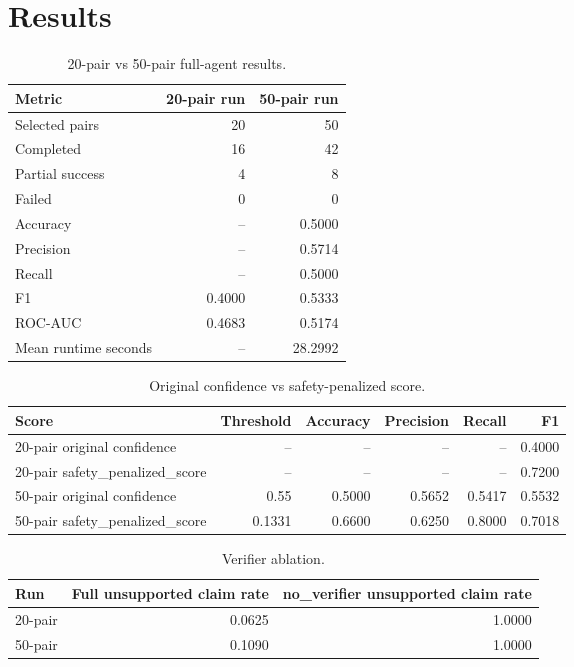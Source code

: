 \documentclass[11pt]{article}
\begin{document}
\section{Results}
\begin{table}[htbp]
\centering
\caption{20-pair vs 50-pair full-agent results.}
\begin{tabular}{lrr}
\toprule
Metric & 20-pair run & 50-pair run \\
\midrule
Selected pairs & 20 & 50 \\
Completed & 16 & 42 \\
Partial success & 4 & 8 \\
Failed & 0 & 0 \\
Accuracy & -- & 0.5000 \\
Precision & -- & 0.5714 \\
Recall & -- & 0.5000 \\
F1 & 0.4000 & 0.5333 \\
ROC-AUC & 0.4683 & 0.5174 \\
Mean runtime seconds & -- & 28.2992 \\
\bottomrule
\end{tabular}
\end{table}

\begin{table}[htbp]
\centering
\caption{Original confidence vs safety-penalized score.}
\begin{tabular}{lrrrrr}
\toprule
Score & Threshold & Accuracy & Precision & Recall & F1 \\
\midrule
20-pair original confidence & -- & -- & -- & -- & 0.4000 \\
20-pair safety\_penalized\_score & -- & -- & -- & -- & 0.7200 \\
50-pair original confidence & 0.55 & 0.5000 & 0.5652 & 0.5417 & 0.5532 \\
50-pair safety\_penalized\_score & 0.1331 & 0.6600 & 0.6250 & 0.8000 & 0.7018 \\
\bottomrule
\end{tabular}
\end{table}

\begin{table}[htbp]
\centering
\caption{Verifier ablation.}
\begin{tabular}{lrr}
\toprule
Run & Full unsupported claim rate & no\_verifier unsupported claim rate \\
\midrule
20-pair & 0.0625 & 1.0000 \\
50-pair & 0.1090 & 1.0000 \\
\bottomrule
\end{tabular}
\end{table}
\end{document}
